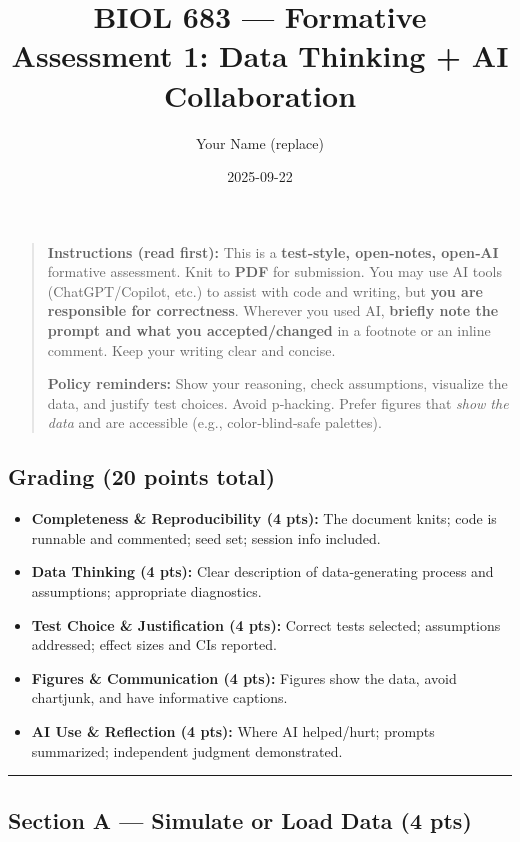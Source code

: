 \documentclass[
  11pt,
]{article}
\title{BIOL 683 --- Formative Assessment 1: Data Thinking + AI
Collaboration}
\author{Your Name (replace)}
\date{2025-09-22}
\providecommand{\tightlist}{%
  \setlength{\itemsep}{0pt}\setlength{\parskip}{0pt}}
\begin{document}
\maketitle

{
\setcounter{tocdepth}{2}
\tableofcontents
}
\begin{quote}
\textbf{Instructions (read first):} This is a \textbf{test‑style,
open‑notes, open‑AI} formative assessment. Knit to \textbf{PDF} for
submission. You may use AI tools (ChatGPT/Copilot, etc.) to assist with
code and writing, but \textbf{you are responsible for correctness}.
Wherever you used AI, \textbf{briefly note the prompt and what you
accepted/changed} in a footnote or an inline comment. Keep your writing
clear and concise.

\textbf{Policy reminders:} Show your reasoning, check assumptions,
visualize the data, and justify test choices. Avoid p‑hacking. Prefer
figures that \emph{show the data} and are accessible (e.g.,
color‑blind‑safe palettes).
\end{quote}

\subsection{Grading (20 points total)}\label{grading-20-points-total}

\begin{itemize}
\tightlist
\item
  \textbf{Completeness \& Reproducibility (4 pts):} The document knits;
  code is runnable and commented; seed set; session info included.
\item
  \textbf{Data Thinking (4 pts):} Clear description of data‑generating
  process and assumptions; appropriate diagnostics.
\item
  \textbf{Test Choice \& Justification (4 pts):} Correct tests selected;
  assumptions addressed; effect sizes and CIs reported.
\item
  \textbf{Figures \& Communication (4 pts):} Figures show the data,
  avoid chartjunk, and have informative captions.
\item
  \textbf{AI Use \& Reflection (4 pts):} Where AI helped/hurt; prompts
  summarized; independent judgment demonstrated.
\end{itemize}

\begin{center}\rule{0.5\linewidth}{0.5pt}\end{center}

\subsection{Section A --- Simulate or Load Data (4
pts)}\label{section-a-simulate-or-load-data-4-pts}
\end{document}
